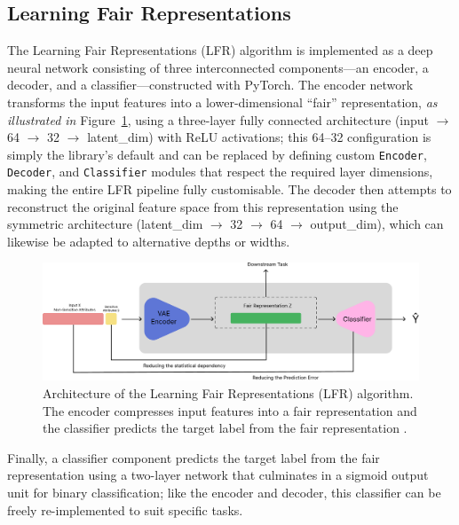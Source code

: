 \documentclass[12pt,a4paper,openright,twoside]{book}
\begin{document}
\subsection{Learning Fair Representations}
The Learning Fair Representations (LFR) algorithm is implemented as a deep neural network consisting of three interconnected components—an encoder, a decoder, and a classifier—constructed with PyTorch. The encoder network transforms the input features into a lower-dimensional “fair” representation, \textit{as illustrated in} Figure~\ref{fig:lfr_architecture}, using a three-layer fully connected architecture (input $\rightarrow$ 64 $\rightarrow$ 32 $\rightarrow$ latent\_dim) with ReLU activations; this 64–32 configuration is simply the library’s default and can be replaced by defining custom \texttt{Encoder}, \texttt{Decoder}, and \texttt{Classifier} modules that respect the required layer dimensions, making the entire LFR pipeline fully customisable. The decoder then attempts to reconstruct the original feature space from this representation using the symmetric architecture (latent\_dim $\rightarrow$ 32 $\rightarrow$ 64 $\rightarrow$ output\_dim), which can likewise be adapted to alternative depths or widths. 

\begin{figure}
\centering
\includegraphics[width=\textwidth]{figures/lfr.pdf}
\caption{Architecture of the Learning Fair Representations (LFR) algorithm. The encoder compresses input features into a fair representation and the classifier predicts the target label from the fair representation \cite{TayebiAidaLfr}.}
\label{fig:lfr_architecture}
\end{figure}

Finally, a classifier component predicts the target label from the fair representation using a two-layer network that culminates in a sigmoid output unit for binary classification; like the encoder and decoder, this classifier can be freely re-implemented to suit specific tasks.
\end{document}

